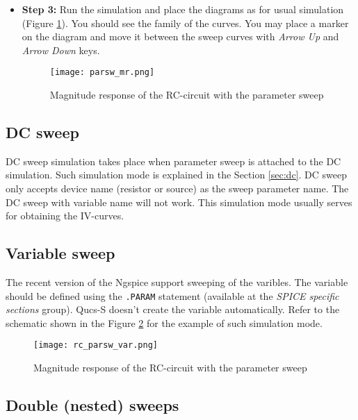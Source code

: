 \begin{itemize}
\item \textbf{Step 3:} Run the simulation and place the diagrams as for usual simulation (Figure \ref{fig:parsw_mr}). You should see the family of the curves. You may place a marker on the diagram and move it between the sweep curves with \emph{Arrow Up} and \emph{Arrow Down} keys.

        \begin{figure}[!ht]
        \begin{center}
            \texttt{[image: parsw\_mr.png]}
        \end{center}
        \caption{Magnitude response of the RC-circuit with the parameter sweep}
    \label{fig:parsw_mr}
    \end{figure}

\end{itemize}


\subsection{DC sweep}

DC sweep simulation takes place when parameter sweep is attached to the DC simulation. Such simulation mode is explained in
the Section \ref{sec:dc}. DC sweep only accepts device name (resistor or source) as the sweep parameter name. The DC sweep with variable name will not work. This simulation mode usually serves for obtaining the IV-curves.

\subsection{Variable sweep}

The recent version of the Ngspice support sweeping of the varibles. The variable should be defined using the \verb|.PARAM|
statement (available at the \emph{SPICE specific sections} group). Qucs-S doesn't create the variable automatically. Refer to the schematic shown in the Figure \ref{fig:rc_parsw_var} for the example of such simulation mode.

\begin{figure}[!ht]
    \begin{center}
        \texttt{[image: rc\_parsw\_var.png]}
    \end{center}
    \caption{Magnitude response of the RC-circuit with the parameter sweep}
    \label{fig:rc_parsw_var}
\end{figure}

\subsection{Double (nested) sweeps}

